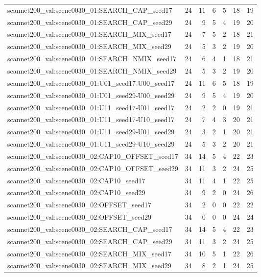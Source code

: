 \begin{table}[t]
\begin{tabular}{lrrrrrr}
scannet200\_val:scene0030\_01:SEARCH\_CAP\_seed17 & 24 & 11 & 6 & 5 & 18 & 19 \\
scannet200\_val:scene0030\_01:SEARCH\_CAP\_seed29 & 24 & 9 & 5 & 4 & 19 & 20 \\
scannet200\_val:scene0030\_01:SEARCH\_MIX\_seed17 & 24 & 7 & 5 & 2 & 18 & 21 \\
scannet200\_val:scene0030\_01:SEARCH\_MIX\_seed29 & 24 & 5 & 3 & 2 & 19 & 20 \\
scannet200\_val:scene0030\_01:SEARCH\_NMIX\_seed17 & 24 & 6 & 4 & 1 & 18 & 21 \\
scannet200\_val:scene0030\_01:SEARCH\_NMIX\_seed29 & 24 & 5 & 3 & 2 & 19 & 20 \\
scannet200\_val:scene0030\_01:U01\_seed17-U00\_seed17 & 24 & 11 & 6 & 5 & 18 & 19 \\
scannet200\_val:scene0030\_01:U01\_seed29-U00\_seed29 & 24 & 9 & 5 & 4 & 19 & 20 \\
scannet200\_val:scene0030\_01:U11\_seed17-U01\_seed17 & 24 & 2 & 2 & 0 & 19 & 21 \\
scannet200\_val:scene0030\_01:U11\_seed17-U10\_seed17 & 24 & 7 & 4 & 3 & 20 & 21 \\
scannet200\_val:scene0030\_01:U11\_seed29-U01\_seed29 & 24 & 3 & 2 & 1 & 20 & 21 \\
scannet200\_val:scene0030\_01:U11\_seed29-U10\_seed29 & 24 & 5 & 3 & 2 & 20 & 21 \\
scannet200\_val:scene0030\_02:CAP10\_OFFSET\_seed17 & 34 & 14 & 5 & 4 & 22 & 23 \\
scannet200\_val:scene0030\_02:CAP10\_OFFSET\_seed29 & 34 & 11 & 3 & 2 & 24 & 25 \\
scannet200\_val:scene0030\_02:CAP10\_seed17 & 34 & 11 & 4 & 1 & 22 & 25 \\
scannet200\_val:scene0030\_02:CAP10\_seed29 & 34 & 9 & 2 & 0 & 24 & 26 \\
scannet200\_val:scene0030\_02:OFFSET\_seed17 & 34 & 2 & 0 & 0 & 22 & 22 \\
scannet200\_val:scene0030\_02:OFFSET\_seed29 & 34 & 0 & 0 & 0 & 24 & 24 \\
scannet200\_val:scene0030\_02:SEARCH\_CAP\_seed17 & 34 & 14 & 5 & 4 & 22 & 23 \\
scannet200\_val:scene0030\_02:SEARCH\_CAP\_seed29 & 34 & 11 & 3 & 2 & 24 & 25 \\
scannet200\_val:scene0030\_02:SEARCH\_MIX\_seed17 & 34 & 10 & 5 & 1 & 22 & 26 \\
scannet200\_val:scene0030\_02:SEARCH\_MIX\_seed29 & 34 & 8 & 2 & 1 & 24 & 25 \\

\end{tabular}
\end{table}

